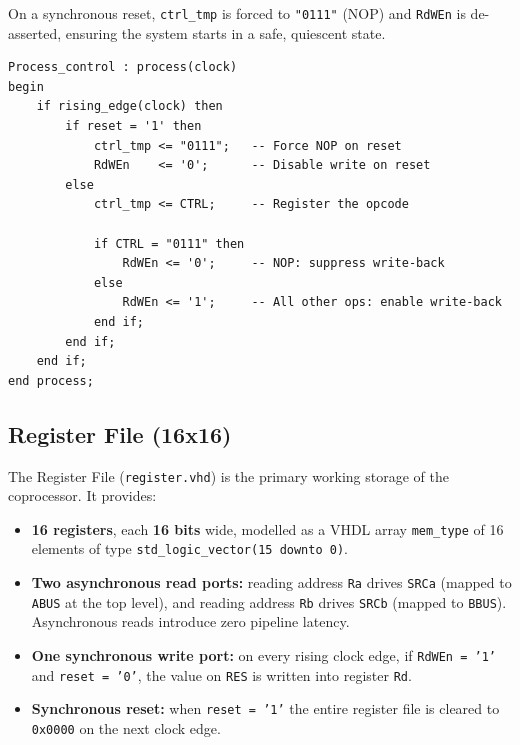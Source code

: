 \documentclass[12pt, a4paper]{report}
\begin{document}
\newpage
On a synchronous reset, \texttt{ctrl\_tmp} is forced to \texttt{"0111"} (NOP) and
\texttt{RdWEn} is de-asserted, ensuring the system starts in a safe, quiescent state.


\begin{lstlisting}[caption={Input pipeline register and write-enable logic (crypto\_core16.vhd).},
                   label={lst:pipeline}]
Process_control : process(clock)
begin
    if rising_edge(clock) then
        if reset = '1' then
            ctrl_tmp <= "0111";   -- Force NOP on reset
            RdWEn    <= '0';      -- Disable write on reset
        else
            ctrl_tmp <= CTRL;     -- Register the opcode

            if CTRL = "0111" then
                RdWEn <= '0';     -- NOP: suppress write-back
            else
                RdWEn <= '1';     -- All other ops: enable write-back
            end if;
        end if;
    end if;
end process;
\end{lstlisting}

\subsection{Register File (16x16)}

The Register File (\texttt{register.vhd}) is the primary working storage of the
coprocessor. It provides:

\begin{itemize}
  \item \textbf{16 registers}, each \textbf{16 bits} wide, modelled as a
        VHDL array \texttt{mem\_type} of 16 elements of type
        \texttt{std\_logic\_vector(15 downto 0)}.
  \item \textbf{Two asynchronous read ports:} reading address \texttt{Ra} drives
        \texttt{SRCa} (mapped to \texttt{ABUS} at the top level), and reading address
        \texttt{Rb} drives \texttt{SRCb} (mapped to \texttt{BBUS}).
        Asynchronous reads introduce zero pipeline latency.
  \item \textbf{One synchronous write port:} on every rising clock edge, if
        \texttt{RdWEn = '1'} and \texttt{reset = '0'}, the value on \texttt{RES}
        is written into register \texttt{Rd}.
  \item \textbf{Synchronous reset:} when \texttt{reset = '1'} the entire register
        file is cleared to \texttt{0x0000} on the next clock edge.
\end{itemize}
\newpage
\end{document}
